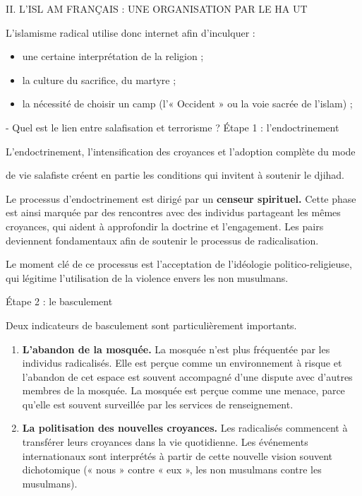 II. L'ISL AM FRANÇAIS : UNE ORGANISATION PAR LE HA UT

L'islamisme radical utilise donc internet afin d'inculquer :


\begin{itemize}
\item
  une certaine interprétation de la religion ;
\item
  la culture du sacrifice, du martyre ;
\item
  la nécessité de choisir un camp (l'« Occident » ou la voie sacrée de
  l'islam) ;
\end{itemize}

- Quel est le lien entre salafisation et terrorisme ? Étape 1 :
l'endoctrinement


L'endoctrinement, l'intensification des croyances et l'adoption complète
du mode

de vie salafiste créent en partie les conditions qui invitent à soutenir
le djihad.

Le processus d'endoctrinement est dirigé par un \textbf{censeur
spirituel.} Cette phase est ainsi marquée par des rencontres avec des
individus partageant les mêmes croyances, qui aident à approfondir la
doctrine et l'engagement. Les pairs deviennent fondamentaux afin de
soutenir le processus de radicalisation.

Le moment clé de ce processus est l'acceptation de l'idéologie
politico-religieuse, qui légitime l'utilisation de la violence envers
les non musulmans.


Étape 2 : le basculement


Deux indicateurs de basculement sont particulièrement importants.


\begin{enumerate}
\def\labelenumi{\arabic{enumi}.}
\item
  \textbf{L'abandon de la mosquée.} La mosquée n'est plus fréquentée par
  les individus radicalisés. Elle est perçue comme un environnement à
  risque et l'abandon de cet espace est souvent accompagné d'une dispute
  avec d'autres membres de la mosquée. La mosquée est perçue comme une
  menace, parce qu'elle est souvent surveillée par les services de
  renseignement.
\item
  \textbf{La politisation des nouvelles croyances.} Les radicalisés
  commencent à transférer leurs croyances dans la vie quotidienne. Les
  événements internationaux sont interprétés à partir de cette nouvelle
  vision souvent dichotomique (« nous » contre « eux », les non
  musulmans contre les musulmans).
\end{enumerate}





